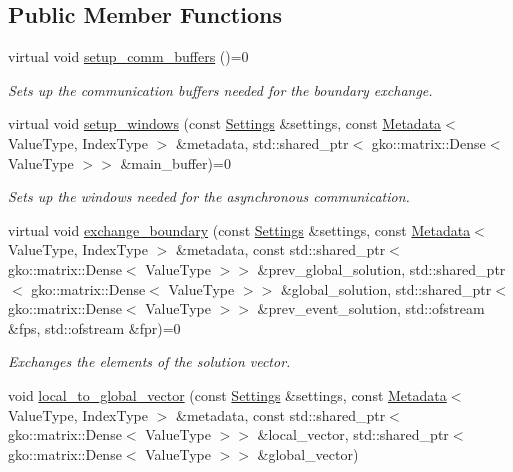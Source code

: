 \subsection*{Public Member Functions}
\begin{DoxyCompactItemize}
\item 
\mbox{\label{classschwz_1_1Communicate_a76b0d6b0571107ab2cd58e309902a666}} 
virtual void \hyperlink{classschwz_1_1Communicate_a76b0d6b0571107ab2cd58e309902a666}{setup\+\_\+comm\+\_\+buffers} ()=0
\begin{DoxyCompactList}\small\item\em Sets up the communication buffers needed for the boundary exchange. \end{DoxyCompactList}\item 
virtual void \hyperlink{classschwz_1_1Communicate_a13190372f3a6193f92226d08e822fde7}{setup\+\_\+windows} (const \hyperlink{structschwz_1_1Settings}{Settings} \&settings, const \hyperlink{structschwz_1_1Metadata}{Metadata}$<$ Value\+Type, Index\+Type $>$ \&metadata, std\+::shared\+\_\+ptr$<$ gko\+::matrix\+::\+Dense$<$ Value\+Type $>$$>$ \&main\+\_\+buffer)=0
\begin{DoxyCompactList}\small\item\em Sets up the windows needed for the asynchronous communication. \end{DoxyCompactList}\item 
virtual void \hyperlink{classschwz_1_1Communicate_ac2a1e0aae9a645a1733e4f1e47cdd691}{exchange\+\_\+boundary} (const \hyperlink{structschwz_1_1Settings}{Settings} \&settings, const \hyperlink{structschwz_1_1Metadata}{Metadata}$<$ Value\+Type, Index\+Type $>$ \&metadata, const std\+::shared\+\_\+ptr$<$ gko\+::matrix\+::\+Dense$<$ Value\+Type $>$$>$ \&prev\+\_\+global\+\_\+solution, std\+::shared\+\_\+ptr$<$ gko\+::matrix\+::\+Dense$<$ Value\+Type $>$$>$ \&global\+\_\+solution, std\+::shared\+\_\+ptr$<$ gko\+::matrix\+::\+Dense$<$ Value\+Type $>$$>$ \&prev\+\_\+event\+\_\+solution, std\+::ofstream \&fps, std\+::ofstream \&fpr)=0
\begin{DoxyCompactList}\small\item\em Exchanges the elements of the solution vector. \end{DoxyCompactList}\item 
void \hyperlink{classschwz_1_1Communicate_a8c1ed0c5f86c458038b4062f57337d44}{local\+\_\+to\+\_\+global\+\_\+vector} (const \hyperlink{structschwz_1_1Settings}{Settings} \&settings, const \hyperlink{structschwz_1_1Metadata}{Metadata}$<$ Value\+Type, Index\+Type $>$ \&metadata, const std\+::shared\+\_\+ptr$<$ gko\+::matrix\+::\+Dense$<$ Value\+Type $>$$>$ \&local\+\_\+vector, std\+::shared\+\_\+ptr$<$ gko\+::matrix\+::\+Dense$<$ Value\+Type $>$$>$ \&global\+\_\+vector)

\end{DoxyCompactItemize}
